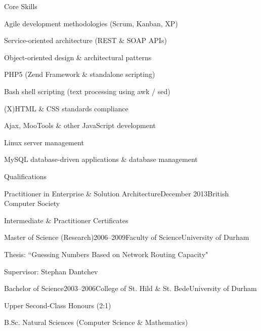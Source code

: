 \documentclass{cv}
\begin{document}
\begin{rSection}{Core Skills}

\begin{rSubsection}{}{}{}{}
\item Agile development methodologies (Scrum, Kanban, XP)
\item Service-oriented architecture (REST \& SOAP APIs)
\item Object-oriented design \& architectural patterns
\item PHP5 (Zend Framework \& standalone scripting)
\item Bash shell scripting (text processing using awk / sed)
\item (X)HTML \& CSS standards compliance
\item Ajax, MooTools \& other JavaScript development
\item Linux server management
\item MySQL database-driven applications \& database management
\end{rSubsection}

\end{rSection}


\begin{rSection}{Qualifications}

\begin{rSubsection}{Practitioner in Enterprise \& Solution Architecture}{December 2013}{British Computer Society}{}
\item Intermediate \& Practitioner Certificates
\end{rSubsection}

\begin{rSubsection}{Master of Science (Research)}{2006--2009}{Faculty of Science}{University of Durham}
\item Thesis: ``Guessing Numbers Based on Network Routing Capacity"
\item Supervisor: Stephan Dantchev
\end{rSubsection}

\begin{rSubsection}{Bachelor of Science}{2003--2006}{College of St. Hild \& St. Bede}{University of Durham}
\item Upper Second-Class Honours (2:1)
\item B.Sc. Natural Sciences (Computer Science \& Mathematics)
\end{rSubsection}

\end{rSection}
\end{document}
